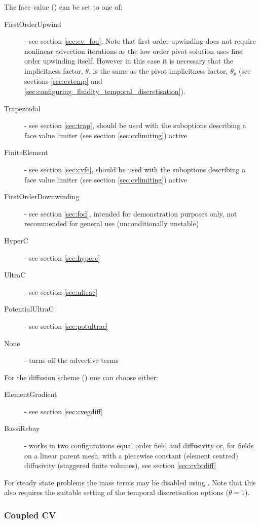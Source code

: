 The face value () can be set to one of:
\begin{description}
\item[FirstOrderUpwind] - see section \ref{sec:cv_fou}.  Note that first order upwinding does not require nonlinear advection iterations as the low order pivot solution uses first order upwinding itself.  However in this case it is necessary that the implicitness factor, $\theta$, is the same as the pivot implicitness factor, $\theta_p$ (see sections \ref{sec:cvtemp} and \ref{sec:configuring_fluidity_temporal_discretisation}).
\item[Trapezoidal] - see section \ref{sec:trap}, should be used with the suboptions describing a face value limiter (see section \ref{sec:cvlimiting}) active
\item[FiniteElement] - see section \ref{sec:cvfe}, should be used with the suboptions describing a face value limiter (see section \ref{sec:cvlimiting}) active
\item[FirstOrderDownwinding] - see section \ref{sec:fod}, intended for demonstration purposes only, not recommended for general use (unconditionally unstable)
\item[HyperC] - see section \ref{sec:hyperc}
\item[UltraC] - see section \ref{sec:ultrac}
\item[PotentialUltraC] - see section \ref{sec:potultrac}
\item[None] - turns off the advective terms
\end{description}

For the diffusion scheme () one can choose either:
\begin{description}
\item[ElementGradient] - see section \ref{sec:cvegdiff}
\item[BassiRebay] - works in two configurations equal order field and diffusivity or, for fields on a linear parent mesh, with a piecewise constant (element centred) diffusivity (staggered finite volumes), see section \ref{sec:cvbrdiff}
\end{description}

For steady state problems the mass terms may be disabled using .  Note that this also requires the suitable setting of the temporal discretisation options ($\theta=1$).

\subsubsection{Coupled CV}\label{sec:CoupledCVs}

